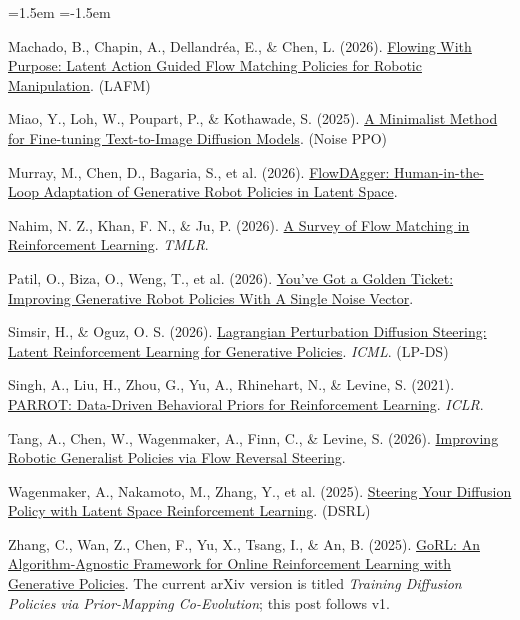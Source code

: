 \begin{list}{}{\leftmargin=1.5em \itemindent=-1.5em \itemsep=2pt \parsep=0pt}
\item {}Machado, B., Chapin, A., Dellandréa, E., \& Chen, L. (2026). \href{https://arxiv.org/abs/2606.23420}{Flowing With Purpose: Latent Action Guided Flow Matching Policies for Robotic Manipulation}. (LAFM)
\item {}Miao, Y., Loh, W., Poupart, P., \& Kothawade, S. (2025). \href{https://arxiv.org/abs/2506.12036}{A Minimalist Method for Fine-tuning Text-to-Image Diffusion Models}. (Noise PPO)
\item {}Murray, M., Chen, D., Bagaria, S., et al. (2026). \href{https://arxiv.org/abs/2607.08877}{FlowDAgger: Human-in-the-Loop Adaptation of Generative Robot Policies in Latent Space}.
\item {}Nahim, N. Z., Khan, F. N., \& Ju, P. (2026). \href{https://arxiv.org/abs/2610.16275}{A Survey of Flow Matching in Reinforcement Learning}. \emph{TMLR}.
\item {}Patil, O., Biza, O., Weng, T., et al. (2026). \href{https://arxiv.org/abs/2603.15757}{You've Got a Golden Ticket: Improving Generative Robot Policies With A Single Noise Vector}.
\item {}Simsir, H., \& Oguz, O. S. (2026). \href{https://arxiv.org/abs/2606.01151}{Lagrangian Perturbation Diffusion Steering: Latent Reinforcement Learning for Generative Policies}. \emph{ICML}. (LP-DS)
\item {}Singh, A., Liu, H., Zhou, G., Yu, A., Rhinehart, N., \& Levine, S. (2021). \href{https://arxiv.org/abs/2011.10024}{PARROT: Data-Driven Behavioral Priors for Reinforcement Learning}. \emph{ICLR}.
\item {}Tang, A., Chen, W., Wagenmaker, A., Finn, C., \& Levine, S. (2026). \href{https://arxiv.org/abs/2606.13675}{Improving Robotic Generalist Policies via Flow Reversal Steering}.
\item {}Wagenmaker, A., Nakamoto, M., Zhang, Y., et al. (2025). \href{https://arxiv.org/abs/2506.15799}{Steering Your Diffusion Policy with Latent Space Reinforcement Learning}. (DSRL)
\item {}Zhang, C., Wan, Z., Chen, F., Yu, X., Tsang, I., \& An, B. (2025). \href{https://arxiv.org/abs/2512.02581v1}{GoRL: An Algorithm-Agnostic Framework for Online Reinforcement Learning with Generative Policies}. The current arXiv version is titled \emph{Training Diffusion Policies via Prior-Mapping Co-Evolution}; this post follows v1.

\end{list}

